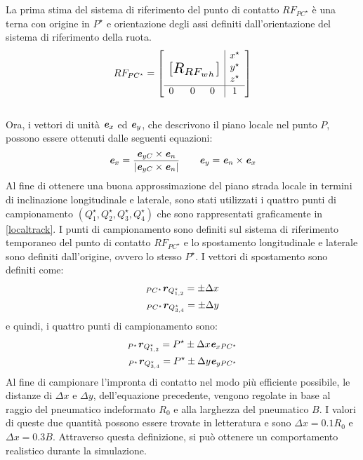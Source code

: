 %
\noindent
La prima stima del sistema di riferimento del punto di contatto $RF_{PC^\star}$ è una terna con origine in $P^\star$ e orientazione degli assi definiti dall'orientazione del sistema di riferimento della ruota.
%
\begin{equation}
RF_{PC^\star} = \left[
\begin{array}{ccc|c}
& & & x^\star\\
\multicolumn{3}{c|}{\multirow{3}{*}{\raisebox{20mm}{\scalebox{1.5}{$[R_{RF_{wh}}]$}}}} & y^\star\\
& & & z^\star\\ \hline
0 & ~~0 & 0 & 1
\end{array}\right]
\end{equation}\\
%
Ora, i vettori di unità $\textbf{\textit{e}}_x$ ed $\textbf{\textit{e}}_y$, che descrivono il piano locale nel punto $P$, possono essere ottenuti dalle seguenti equazioni:
%
\begin{equation}
\textbf{\textit{e}}_x = \frac{\textbf{\textit{e}}_{yC}\times\textbf{\textit{e}}_{n}}{|\textbf{\textit{e}}_{yC}\times\textbf{\textit{e}}_{n}|}
\qquad
\textbf{\textit{e}}_{y} = \textbf{\textit{e}}_{n}\times\textbf{\textit{e}}_{x}
\label{terna}
\end{equation}
%
Al fine di ottenere una buona approssimazione del piano strada locale in termini di inclinazione longitudinale e laterale, sono stati utilizzati i quattro punti di campionamento $(Q^\star_1, Q^\star_2, Q^\star_3, Q^\star_4)$ che sono rappresentati graficamente in \figurename{ \ref{localtrack}}. I punti di campionamento sono definiti sul sistema di riferimento temporaneo del punto di contatto $RF_{PC^\star}$ e lo spostamento longitudinale e laterale sono definiti dall'origine, ovvero lo stesso $P^\star$. I vettori di spostamento sono definiti come:
%
\begin{equation}
\begin{split}
_{PC^\star}\textbf{\textit{r}}_{Q^\star_{1,2}} = \pm \Delta x \\
_{PC^\star}\textbf{\textit{r}}_{Q^\star_{3,4}} = \pm \Delta y
\end{split}
\end{equation}
%
e quindi, i quattro punti di campionamento sono:
%
\begin{equation}
\begin{split}
_{P^\star}\textbf{\textit{r}}_{Q^\star_{1,2}} = P^\star \pm \Delta x \textbf{\textit{e}}_{xPC^\star} \\
_{P^\star}\textbf{\textit{r}}_{Q^\star_{3,4}} = P^\star \pm \Delta y \textbf{\textit{e}}_{yPC^\star}
\end{split}
\end{equation}
%
Al fine di campionare l'impronta di contatto nel modo più efficiente possibile, le distanze di $\Delta x$ e $\Delta y$, dell'equazione precedente, vengono regolate in base al raggio del pneumatico indeformato $R_0$ e alla larghezza del pneumatico $B$. I valori di queste due quantità possono essere trovate in letteratura e sono $\Delta x = 0.1 R_0$ e $\Delta x = 0.3 B$. Attraverso questa definizione, si può ottenere un comportamento realistico durante la simulazione.

